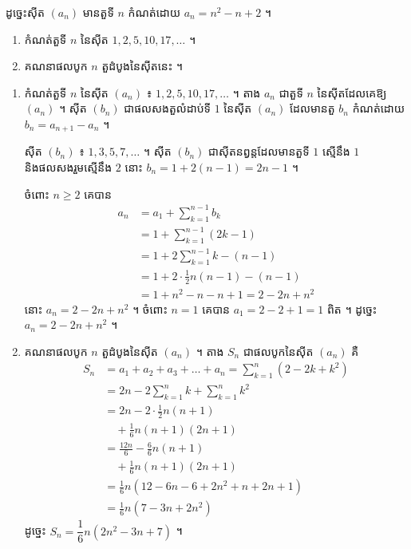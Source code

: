 ដូច្នេះស៊ីត $(a_n)$ មានតួទី $n$ កំណត់ដោយ $a_n = n^2 - n + 2$ ។

\begin{example}[លំហាត់គំរូ ២]
\begin{enumerate}[a]
  \item កំណត់តួទី $n$ នៃស៊ីត $1, 2, 5, 10, 17, \ldots$ ។
  \item គណនាផលបូក $n$ តួដំបូងនៃស៊ីតនេះ ។
\end{enumerate}
\end{example}
\ans
\begin{enumerate}[a]
  \item កំណត់តួទី $n$ នៃស៊ីត $(a_n)$ ៖ $1, 2, 5, 10, 17, \ldots$ ។ តាង $a_n$ ជាតួទី $n$ នៃស៊ីតដែលគេឱ្យ $(a_n)$ ។ ស៊ីត $(b_n)$ ជាផលសងតួលំដាប់ទី $1$ នៃស៊ីត $(a_n)$ ដែលមានតួ $b_n$ កំណត់ដោយ $b_n = a_{n+1} - a_n$ ។

  ស៊ីត $(b_n)$ ៖ $1, 3, 5, 7, \ldots$ ។ ស៊ីត $(b_n)$ ជាស៊ីតនព្វន្តដែលមានតួទី $1$ ស្មើនឹង $1$ និងផលសងរួមស្មើនឹង $2$ នោះ $b_n = 1 + 2(n - 1) = 2n - 1$ ។

  ចំពោះ $n \ge 2$ គេបាន
  \[
  \begin{aligned}
a_n &= a_1 + \sum_{k=1}^{n-1} b_k\\
&= 1 + \sum_{k=1}^{n-1} (2k - 1)\\
&= 1 + 2\sum_{k=1}^{n-1} k - (n - 1)\\
&= 1 + 2 \cdot \frac{1}{2}n(n - 1) - (n - 1)\\
&= 1 + n^2 - n - n + 1 = 2 - 2n + n^2
\end{aligned}
  \]
  នោះ $a_n = 2 - 2n + n^2$ ។ ចំពោះ $n = 1$ គេបាន $a_1 = 2 - 2 + 1 = 1$ ពិត ។ ដូច្នេះ $a_n = 2 - 2n + n^2$ ។
  \item គណនាផលបូក $n$ តួដំបូងនៃស៊ីត $(a_n)$ ។ តាង $S_n$ ជាផលបូកនៃស៊ីត $(a_n)$ គឺ
  \[
  \begin{aligned}
S_n &= a_1 + a_2 + a_3 + \ldots + a_n = \sum_{k=1}^{n} (2 - 2k + k^2)\\
&= 2n - 2\sum_{k=1}^{n} k + \sum_{k=1}^{n} k^2\\
&= 2n - 2 \cdot \frac{1}{2}n(n + 1)\\
&\quad + \frac{1}{6}n(n + 1)(2n + 1)\\
&= \frac{12n}{6} - \frac{6}{6}n(n + 1)\\
&\quad + \frac{1}{6}n(n + 1)(2n + 1)\\
&= \frac{1}{6}n(12 - 6n - 6 + 2n^2 + n + 2n + 1)\\
&= \frac{1}{6}n(7 - 3n + 2n^2)
\end{aligned}
  \]
  ដូច្នេះ $S_n = \dfrac{1}{6}n(2n^2 - 3n + 7)$ ។
\end{enumerate}


